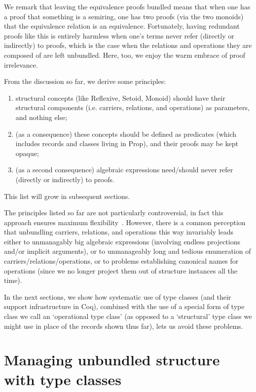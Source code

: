 \documentclass[a4paper,10pt, runningheads]{llncs}
\begin{document}
We remark that leaving the equivalence proofs bundled means that when one has a proof that something
is a semiring, one has two proofs (via the two monoids) that the equivalence relation is an
equivalence. Fortunately, having redundant proofs like this is entirely harmless when one's terms
never refer (directly or indirectly) to proofs, which is the case when the relations and operations
they are composed of are left unbundled. Here, too, we enjoy the warm embrace of proof irrelevance.

From the discussion so far, we derive some principles:
\begin{enumerate}
 \item structural concepts (like Reflexive, Setoid, Monoid) should have their structural components
(i.e. carriers, relations, and operations) as parameters, and nothing else;
 \item (as a consequence) these concepts should be defined as predicates (which includes records and
classes living in Prop), and their proofs may be kept opaque;
 \item (as a second consequence) algebraic expressions need/should never refer (directly or
indirectly) to proofs.
\end{enumerate}

This list will grow in subsequent sections.

The principles listed so far are not particularly controversial, in fact this
approach ensures maximum flexibility~\cite{Hints}. However,
there is a common perception that unbundling carriers, relations, and operations this way invariably
leads either to unmanagably big algebraic expressions (involving endless projections and/or implicit
arguments), or to unmanageably long and tedious enumeration of carriers/relations/operations, or to
problems establishing canonical names for operations (since we no longer project them out of
structure instances all the time).

In the next sections, we show how systematic use of type classes (and their support infrastructure
in Coq), combined with the use of a special form of type class we call an `operational type class'
(as opposed to a `structural' type class we might use in place of the records shown thus far), lets
us avoid these problems.

\section{Managing unbundled structure with type classes}
\end{document}
